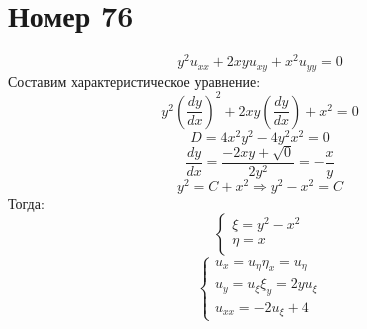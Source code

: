 \section*{Номер 76}
$$ y^2 u_{xx} + 2xy u_{xy} + x^2 u_{yy} = 0 $$
Составим характеристическое уравнение:
$$ y^2 \left(\dfrac{dy}{dx}\right)^2 + 2xy \left(\dfrac{dy}{dx}\right) + x^2 = 0 $$
$$ D = 4x^2y^2 - 4 y^2 x^2 = 0 $$
$$ \dfrac{dy}{dx} = \dfrac{-2xy +\sqrt{0}}{2y^2} = -\dfrac{x}{y} $$
$$ y^2 = C + x^2 \Rightarrow y^2 - x^2 = C $$
Тогда:
$$ \begin{cases}
        \xi = y^2 - x^2 \\
        \eta = x        \\
    \end{cases} $$
$$ \begin{cases}
        u_x = u_\eta \eta_x = u_\eta \\
        u_y = u_\xi \xi_y = 2y u_\xi \\
        u_{xx} = -2u_\xi + 4
    \end{cases} $$

